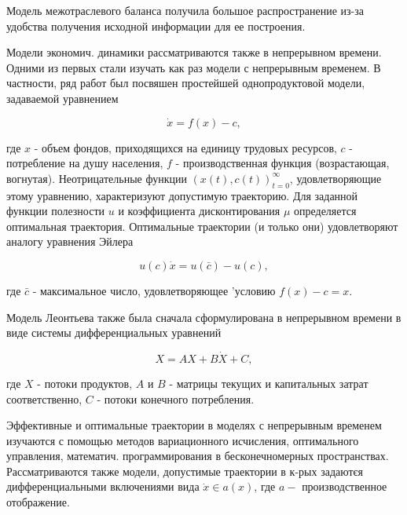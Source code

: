 \documentclass[10pt]{article}
\begin{document}
Модель межотраслевого баланса получила большое распространение из-за удобства получения исходной информации для ее построения.



Модели экономич. динамики рассматриваются также в непрерывном времени. Одними из первых стали изучать как раз модели с непрерывным временем. В частности, ряд работ был посвяшен простейшей однопродуктовой модели, задаваемой уравнением



\[

\dot{x}=f(x)-c,

\]



где $x$ - объем фондов, приходящихся на единицу трудовых ресурсов, $c$ - потребление на душу населения, $f$ - производственная функция (возрастающая, вогнутая). Неотрицательные функции $(x(t), c(t))_{t=0}^{\infty}$, удовлетворяющие этому уравнению, характеризуют допустимую траекторию. Для заданной функции полезности $u$ и коэффициента дисконтирования $\mu$ определяется оптимальная траектория. Оптимальные траектории (и только они) удовлетворяют аналогу уравнения Эйлера



\[

u(c) \dot{x}=u(\bar{c})-u(c),

\]



где $\bar{c}$ - максимальное число, удовлетворяющее 'условию $f(x)-c=x$.



Модель Леонтьева также была сначала сформулирована в непрерывном времени в виде системы дифференциальных уравнений



\[

X=A X+B \dot{X}+C,

\]



где $X$ - потоки продуктов, $A$ и $B$ - матрицы текущих и капитальных затрат соответственно, $C$ - потоки конечного потребления.



Эффективные и оптимальные траектории в моделях с непрерывным временем изучаются с помощью методов вариационного исчисления, оптимального управления, математич. программирования в бесконечномерных пространствах. Рассматриваются также модели, допустимые траектории в к-рых задаютєя дифференциальными включениями вида $\dot{x} \in a(x)$, где $a-$ производственное отображение.
\end{document}
